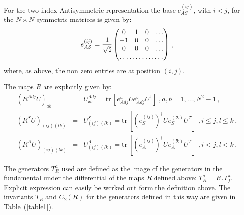 \documentclass{article}[12pt]
\begin{document}
For the two-index Antisymmetric representation the base $e^{(ij)}_{AS}$, with $i<j$, for 
the $N\times N$ symmetric matrices is given by:
\begin{equation}
e^{(ij)}_{AS}=\frac{1}{\sqrt{2}}\begin{pmatrix} 
0&1&0&\dots\\
-1&0&0&\dots\\
0&0&0&\dots\\
\hdotsfor{4}
\end{pmatrix}\, , 
\end{equation}
where, as above, the non zero entries are at position $(i,j)$.

The maps $R$ are explicitly given by:
\begin{eqnarray}
(R^{Adj} U)_{ab} &=& U^{Adj}_{ab} = \mathrm{tr\ }\left[ e^a_{Adj} U e^b_{Adj} U^\dagger\right]\,\, , a,b=1,\dots,N^2-1\, ,\\ 
(R^{S} U)_{(ij)(lk)} &=& U^{S}_{(ij)(lk)} = \mathrm{tr\ }\left[ (e^{(ij)}_{S})^\dagger U e^{(lk)}_S U^T\right]\,\, , i\le j, l\le k\, ,\\ 
(R^{A} U)_{(ij)(lk)} &=& U^{A}_{(ij)(lk)} = \mathrm{tr\ }\left[ (e^{(ij)}_{A})^\dagger U e^{(lk)}_A U^T\right]\,\, , i< j, l< k\, .
\end{eqnarray}

The generators $T_R^a$ used are defined as the image of the generators in the fundamental
under the differential of the maps $R$ defined above: $T^a_R = R_* T^a_f$.
Explicit expression can easily be worked out form the definition above.
The invariants $T_R$ and $C_2(R)$ for the generators defined in this way are given in 
Table~(\ref{table1}).
\end{document}
